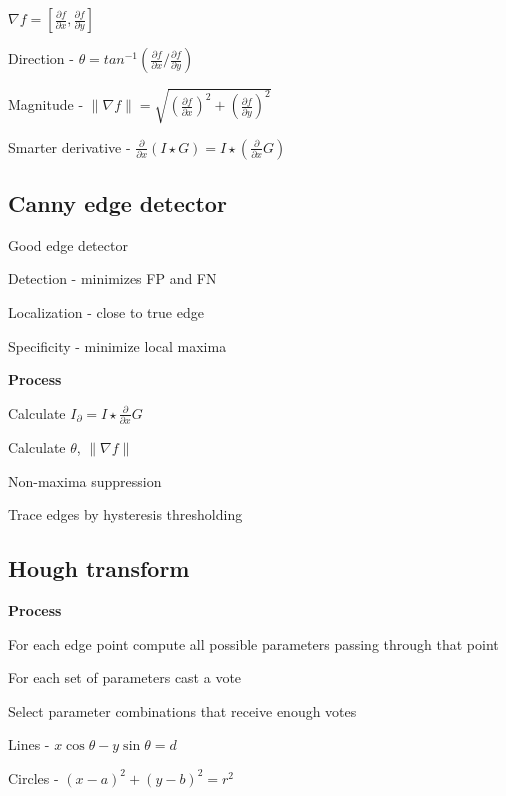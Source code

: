 \documentclass{article}
\begin{document}
\begin{multicols*}{2}
{$\nabla f = [\frac{\partial f}{\partial x}, \frac{\partial f}{\partial y}]$

Direction - $\theta = tan^{-1}(\frac{\partial f}{\partial x} / \frac{\partial f}{\partial y})$

Magnitude - $\| \nabla f \| = \sqrt{(\frac{\partial f}{\partial x})^2 + (\frac{\partial f}{\partial y})^2}$

Smarter derivative - $\frac{\partial}{\partial x}(I \star G) = I \star (\frac{\partial}{\partial x} G)$

\subsection{Canny edge detector}

Good edge detector

\begin{compactitem}
	\item Detection - minimizes FP and FN
	\item Localization - close to true edge
	\item Specificity - minimize local maxima
\end{compactitem}

\textbf{Process}
\begin{compactenum}
	\item Calculate $I_\partial = I \star \frac{\partial}{\partial x} G$
	\item Calculate $\theta$, $\| \nabla f \|$
	\item Non-maxima suppression
	\item Trace edges by hysteresis thresholding
\end{compactenum}

\subsection{Hough transform}

\textbf{Process}
\begin{compactenum}
	\item For each edge point compute all possible parameters passing through that point
	\item For each set of parameters cast a vote
	\item Select parameter combinations that receive enough votes
\end{compactenum}

Lines - $x \cos \theta - y \sin \theta = d$

Circles - $(x - a)^2 + (y - b)^2 = r^2$

}
\end{multicols*}
\end{document}
